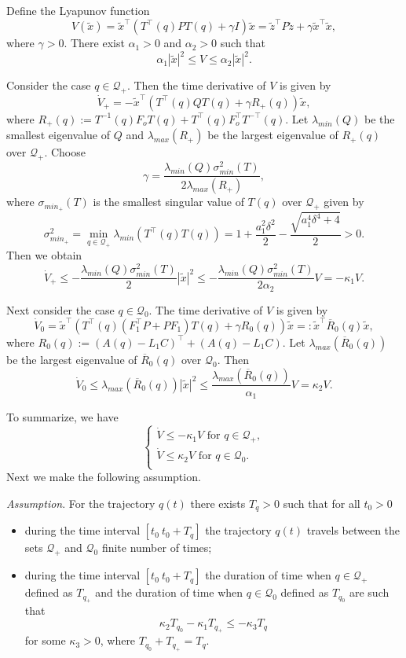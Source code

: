 Define the Lyapunov function
\[
	V(\tilde{x}) = \tilde{x}^\top \left(T^\top(q)PT(q) + \gamma I\right)\tilde{x} = 
	\tilde{z}^\top P\tilde{z} + \gamma\tilde{x}^\top\tilde{x},
\]
where $\gamma>0$. There exist $\alpha_1>0$ and $\alpha_2>0$ such that
\[
	\alpha_1|\tilde{x}|^2 \le V \le \alpha_2|\tilde{x}|^2.
\]

Consider the case $q\in\mathcal{Q}_+$. Then the time derivative of $V$ is given by
\[
	\dot{V}_+ = - \tilde{x}^\top \left(T^\top(q) Q T(q) + \gamma R_+(q)\right) \tilde{x},
\]
where $R_+(q):=T^{-1}(q) F_o T(q) + T^\top(q) F_o^\top T^{-\top}(q)$. Let $\lambda_{min}(Q)$ be the smallest eigenvalue of $Q$ and $\lambda_{max}(R_+)$ be the largest eigenvalue of $R_+(q)$ over $\mathcal{Q}_+$. Choose 
\[
	\gamma = \frac{\lambda_{min}(Q)\sigma_{min}^2(T)}{2\lambda_{max}(R_+)},
\]
where $\sigma_{min_+}(T)$ is the smallest singular value of $T(q)$ over $\mathcal{Q}_+$ given by
\[
	\sigma_{min_+}^2 = \min_{q\in \mathcal{Q}_+}\lambda_{min}(T^\top(q)T(q)) = 1 + \frac{a_1^2\delta^2}{2} - \frac{\sqrt{a_1^4\delta^4+4}}{2} >0.
\]
Then we obtain
\[
	\dot{V}_+ \le - \frac{\lambda_{min}(Q)\sigma_{min}^2(T)}{2}|\tilde{x}|^2 \le -\frac{\lambda_{min}(Q)\sigma_{min}^2(T)}{2\alpha_2}V = -\kappa_1V.
\]

Next consider the case $q\in\mathcal{Q}_0$. The time derivative of $V$ is given by
\[
	\dot{V}_0 = \tilde{x}^\top\left( T^\top(q) \left(F_1^\top P + PF_1\right) T(q) + \gamma  R_0(q)\right)\tilde{x} =: \tilde{x}^\top \overline{R}_0(q) \tilde{x},
\]
where $R_0(q):=\left(A(q)-L_1C\right)^\top + \left(A(q)-L_1C\right)$. Let $\lambda_{max}(\overline{R}_0(q))$ be the largest eigenvalue of $\overline{R}_0(q)$ over $\mathcal{Q}_0$. Then
\[
	\dot{V}_0 \le \lambda_{max}(\overline{R}_0(q)) |\tilde{x}|^2 \le \frac{\lambda_{max}(\overline{R}_0(q))}{\alpha_1}V= \kappa_2V.
\]

To summarize, we have
\[
	\begin{cases}
		\dot{V} \le -\kappa_1V \text{ for } q\in \mathcal{Q}_+, \\
		\dot{V} \le \kappa_2V \text{ for } q\in \mathcal{Q}_0. \\
	\end{cases}
\]
Next we make the following assumption.

\noindent\emph{Assumption}. For the trajectory $q(t)$ there exists $T_q>0$ such that for all $t_0>0$
\begin{itemize}
	\item during the time interval $[t_0 \ t_0+T_q]$ the trajectory $q(t)$ travels between the sets $\mathcal{Q}_+$ and $\mathcal{Q}_0$ finite number of times;
	\item during the time interval $[t_0 \ t_0+T_q]$ the duration of time when $q\in\mathcal{Q}_+$ defined as $T_{q_+}$ and the duration of time when $q\in\mathcal{Q}_0$ defined as $T_{q_0}$ are such that
	\[
		\kappa_2T_{q_0} - \kappa_1T_{q_+} \le -\kappa_3T_q
	\]
	for some $\kappa_3>0$, where $T_{q_0} + T_{q_+} = T_q$.
\end{itemize}

